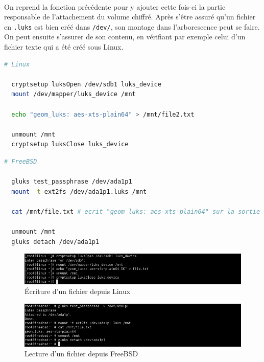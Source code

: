 \paragraph{}
On reprend la fonction précédente pour y ajouter cette fois-ci la partie
responsable de l'attachement du volume chiffré. Après s'être assuré qu'un
fichier en \texttt{.luks} est bien créé dans \texttt{/dev/}, son montage dans
l'arborescence peut se faire. On peut ensuite s'assurer de son contenu, en
vérifiant par exemple celui d'un fichier texte qui a été créé sous Linux.
\\
\begin{lstlisting}[language=bash]
  # Linux

  cryptsetup luksOpen /dev/sdb1 luks_device
  mount /dev/mapper/luks_device /mnt
  
  echo "geom_luks: aes-xts-plain64" > /mnt/file2.txt

  unmount /mnt
  cryptsetup luksClose luks_device
\end{lstlisting}
\begin{lstlisting}[language=bash]
  # FreeBSD

  gluks test_passphrase /dev/ada1p1
  mount -t ext2fs /dev/ada1p1.luks /mnt
  
  cat /mnt/file.txt # ecrit "geom_luks: aes-xts-plain64" sur la sortie standard

  unmount /mnt
  gluks detach /dev/ada1p1
\end{lstlisting}
\begin{figure}[H]
  \centering
  \includegraphics[width=\linewidth]{tests/linux_write_file.png}
  \caption{\label{fig:linux_write_file}Écriture d'un fichier depuis Linux}
\end{figure}
\begin{figure}[H]
  \centering
  \includegraphics[width=\linewidth]{tests/freebsd_read_file.png}
  \caption{\label{fig:freebsd_read_file}Lecture d'un fichier depuis FreeBSD}
\end{figure}

